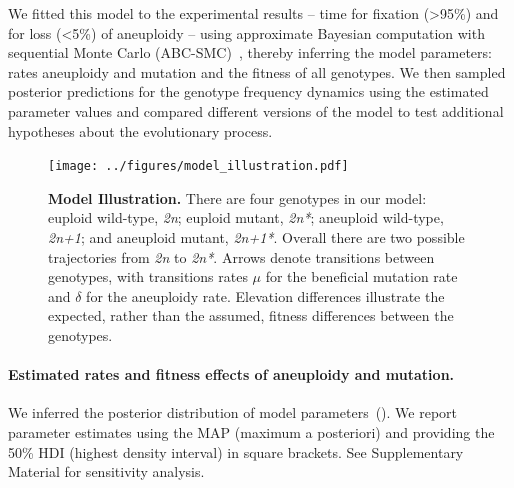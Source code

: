 \documentclass[12pt]{extarticle}
\newcommand{\euwt}{\emph{2n}}
\newcommand{\anwt}{\emph{2n+1}}
\newcommand{\eumt}{\emph{2n*}}
\newcommand{\anmt}{\emph{2n+1*}}
\begin{document}
We fitted this model to the experimental results\citep{Yona2012} -- time for fixation (>95\%) and for loss (<5\%) of aneuploidy -- using approximate Bayesian computation with sequential Monte Carlo (ABC-SMC)~\citep{Sisson2009}, thereby inferring the model parameters: rates aneuploidy and mutation and the fitness of all genotypes.
We then sampled posterior predictions for the genotype frequency dynamics using the estimated parameter values and compared different versions of the model to test additional hypotheses about the evolutionary process.


\begin{figure}[h]
  \centering
    \texttt{[image: ../figures/model\_illustration.pdf]}      
  \caption{
    \textbf{Model Illustration.}
    There are four genotypes in our model: euploid wild-type, \euwt; euploid mutant, \eumt; aneuploid wild-type, \anwt; and aneuploid mutant, \anmt.
    Overall there are two possible trajectories from \euwt\; to \eumt.
    Arrows denote transitions between genotypes, with transitions rates $\mu$ for the beneficial mutation rate and $\delta$ for the aneuploidy rate.
    Elevation differences illustrate the expected, rather than the assumed, fitness differences between the genotypes.
   }
  \label{fig:models}
\end{figure}


\paragraph{Estimated rates and fitness effects of aneuploidy and mutation.} 
We inferred the posterior distribution of model parameters~(). 
We report parameter estimates using the MAP (maximum a posteriori) and providing the 50\% HDI (highest density interval) in square brackets. See Supplementary Material for sensitivity analysis.
\end{document}
